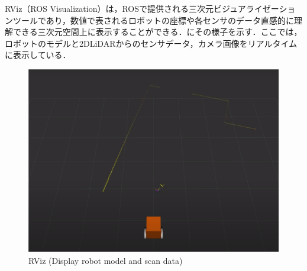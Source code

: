   RViz（ROS Visualization）\cite{rviz}は，ROSで提供される三次元ビジュアライゼーションツールであり，数値で表されるロボットの座標や各センサのデータ直感的に理解できる三次元空間上に表示することができる．にその様子を示す．ここでは，ロボットのモデルと2DLiDARからのセンサデータ，カメラ画像をリアルタイムに表示している．

  \begin{figure}[h]
    \centering
    \includegraphics[keepaspectratio, scale=0.60] {images/RobotGuidance_rviz.png}
    \caption{RViz (Display robot model and scan data)}
    \label{Fig:RobotGuidance_rviz}
  \end{figure}

\newpage